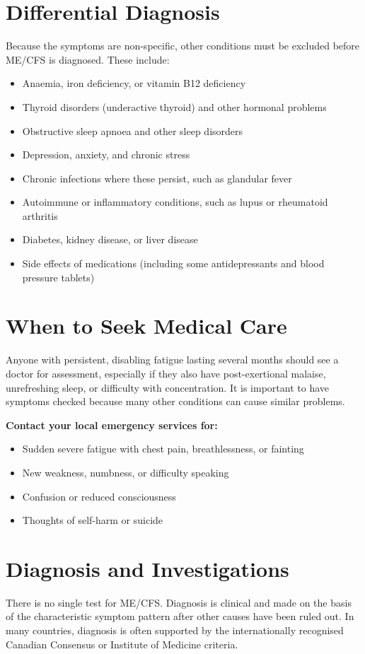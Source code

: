 \section*{Differential Diagnosis}
Because the symptoms are non-specific, other conditions must be excluded before ME/CFS is diagnosed. These include:

\begin{itemize}
    \item Anaemia, iron deficiency, or vitamin B12 deficiency
    \item Thyroid disorders (underactive thyroid) and other hormonal problems
    \item Obstructive sleep apnoea and other sleep disorders
    \item Depression, anxiety, and chronic stress
    \item Chronic infections where these persist, such as glandular fever
    \item Autoimmune or inflammatory conditions, such as lupus or rheumatoid arthritis
    \item Diabetes, kidney disease, or liver disease
    \item Side effects of medications (including some antidepressants and blood pressure tablets)
\end{itemize}

\section*{When to Seek Medical Care}
Anyone with persistent, disabling fatigue lasting several months should see a doctor for assessment, especially if they also have post-exertional malaise, unrefreshing sleep, or difficulty with concentration. It is important to have symptoms checked because many other conditions can cause similar problems.

\textbf{Contact your local emergency services for:}
\begin{itemize}
    \item Sudden severe fatigue with chest pain, breathlessness, or fainting
    \item New weakness, numbness, or difficulty speaking
    \item Confusion or reduced consciousness
    \item Thoughts of self-harm or suicide
\end{itemize}

\section*{Diagnosis and Investigations}
There is no single test for ME/CFS. Diagnosis is clinical and made on the basis of the characteristic symptom pattern after other causes have been ruled out. In many countries, diagnosis is often supported by the internationally recognised Canadian Consensus or Institute of Medicine criteria.

